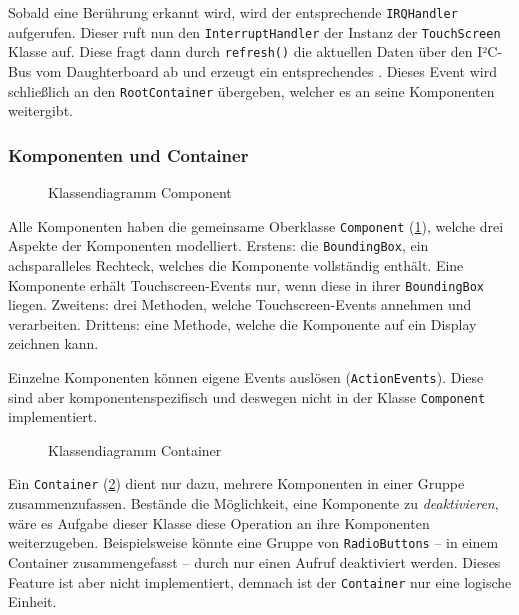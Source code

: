 		Sobald eine Berührung erkannt wird, wird der entsprechende \texttt{IRQHandler} aufgerufen.
		Dieser ruft nun den \texttt{InterruptHandler} der Instanz der \texttt{TouchScreen} Klasse auf.
		Diese fragt dann durch \texttt{refresh()} die aktuellen Daten über den I²C-Bus vom Daughterboard ab und erzeugt ein entsprechendes .
		Dieses Event wird schließlich an den \texttt{RootContainer} übergeben, welcher es an seine Komponenten weitergibt.
	
	\subsubsection{Komponenten und Container}\label{sec:components}
		\begin{figure}
			\scalebox{0.75}{
				\begin{tikzpicture}
					
				\end{tikzpicture}
			}
			\caption{Klassendiagramm Component}
			\label{uml-component}
		\end{figure}
		Alle Komponenten haben die gemeinsame Oberklasse \texttt{Component} (\ref{uml-component}), welche drei Aspekte der Komponenten modelliert. Erstens: die \texttt{BoundingBox}, ein achsparalleles Rechteck, welches die Komponente vollständig enthält.
		Eine Komponente erhält Touchscreen-Events nur, wenn diese in ihrer \texttt{BoundingBox} liegen.
		Zweitens: drei Methoden, welche Touchscreen-Events annehmen und verarbeiten.
		Drittens: eine Methode, welche die Komponente auf ein Display zeichnen kann.
		
		Einzelne Komponenten können eigene Events auslösen (\texttt{ActionEvents}).
		Diese sind aber komponentenspezifisch und deswegen nicht in der Klasse \texttt{Component} implementiert.
		
		\medskip
		\begin{figure}
			\caption{Klassendiagramm Container}
			\label{uml-container}
		\end{figure}
		Ein \texttt{Container} (\ref{uml-container}) dient nur dazu, mehrere Komponenten in einer Gruppe zusammenzufassen.
		Bestände die Möglichkeit, eine Komponente zu \emph{deaktivieren}, wäre es Aufgabe dieser Klasse diese Operation an ihre Komponenten weiterzugeben.
		Beispielsweise könnte eine Gruppe von \texttt{RadioButtons} -- in einem Container zusammengefasst -- durch nur einen Aufruf deaktiviert werden.
		Dieses Feature ist aber nicht implementiert, demnach ist der \texttt{Container} nur eine logische Einheit.
		
